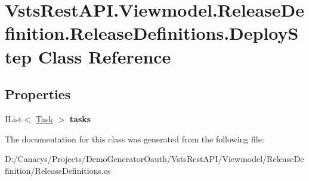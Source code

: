\hypertarget{class_vsts_rest_a_p_i_1_1_viewmodel_1_1_release_definition_1_1_release_definitions_1_1_deploy_step}{}\section{Vsts\+Rest\+A\+P\+I.\+Viewmodel.\+Release\+Definition.\+Release\+Definitions.\+Deploy\+Step Class Reference}
\label{class_vsts_rest_a_p_i_1_1_viewmodel_1_1_release_definition_1_1_release_definitions_1_1_deploy_step}
\subsection*{Properties}
\begin{DoxyCompactItemize}
\item 
\mbox{\label{class_vsts_rest_a_p_i_1_1_viewmodel_1_1_release_definition_1_1_release_definitions_1_1_deploy_step_a53b540e1ceb3aa500ed2db1f84d2137c}} 
I\+List$<$ \mbox{\hyperlink{class_vsts_rest_a_p_i_1_1_viewmodel_1_1_release_definition_1_1_release_definitions_1_1_task}{Task}} $>$ {\bfseries tasks}
\end{DoxyCompactItemize}


The documentation for this class was generated from the following file\+:\begin{DoxyCompactItemize}
\item 
D\+:/\+Canarys/\+Projects/\+Demo\+Generator\+Oauth/\+Vsts\+Rest\+A\+P\+I/\+Viewmodel/\+Release\+Definition/Release\+Definitions.\+cs\end{DoxyCompactItemize}
